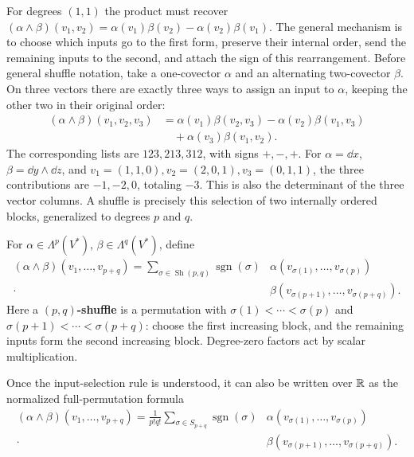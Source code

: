 For degrees $(1,1)$ the product must recover
$(\alpha\wedge\beta)(v_1,v_2)=\alpha(v_1)\beta(v_2)-\alpha(v_2)\beta(v_1)$.
The general mechanism is to choose which inputs go to the first form,
preserve their internal order, send the remaining inputs to the second,
and attach the sign of this rearrangement.
Before general shuffle notation, take a one-covector $\alpha$ and an
alternating two-covector $\beta$. On three vectors there are exactly three
ways to assign an input to $\alpha$, keeping the other two in their
original order:
\[
\begin{aligned}
(\alpha\wedge\beta)(v_1,v_2,v_3)
&=\alpha(v_1)\beta(v_2,v_3)
-\alpha(v_2)\beta(v_1,v_3)\\
&\quad+\alpha(v_3)\beta(v_1,v_2).
\end{aligned}
\]
The corresponding lists are $123,213,312$, with signs $+,-,+$.
For $\alpha=\dd x$, $\beta=\dd y\wedge\dd z$, and
$v_1=(1,1,0),v_2=(2,0,1),v_3=(0,1,1)$, the three contributions
are $-1,-2,0$, totaling $-3$. This is also the determinant of the
three vector columns. A shuffle is precisely this selection of two
internally ordered blocks, generalized to degrees $p$ and $q$.
\begin{definition}\label{def:shuffle-product}
For $\alpha\in\Lambda^p(V^*)$, $\beta\in\Lambda^q(V^*)$, define
\[
\begin{split}
(\alpha\wedge\beta)(v_1,\ldots,v_{p+q})
=\sum_{\sigma\in\operatorname{Sh}(p,q)}\operatorname{sgn}(\sigma)
&\alpha(v_{\sigma(1)},\ldots,v_{\sigma(p)})\\[-2pt]
{}\cdot&\beta(v_{\sigma(p+1)},\ldots,v_{\sigma(p+q)}).
\end{split}
\]
Here a \textbf{$(p,q)$-shuffle} is a permutation with
$\sigma(1)<\cdots<\sigma(p)$ and
$\sigma(p+1)<\cdots<\sigma(p+q)$: choose the first increasing block,
and the remaining inputs form the second increasing block.
Degree-zero factors act by scalar multiplication.
\end{definition}
\begin{remark}
Once the input-selection rule is understood, it can also be written over
$\mathbb{R}$ as the normalized full-permutation formula
\[
\begin{split}
(\alpha\wedge\beta)(v_1,\ldots,v_{p+q})
=\frac{1}{p!q!}\sum_{\sigma\in S_{p+q}}\operatorname{sgn}(\sigma)
&\alpha(v_{\sigma(1)},\ldots,v_{\sigma(p)})\\
{}\cdot&\beta(v_{\sigma(p+1)},\ldots,v_{\sigma(p+q)}).
\end{split}
\]
\end{remark}
